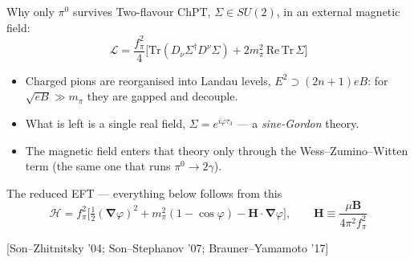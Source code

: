 \documentclass[aspectratio=169,10pt]{beamer}
\newcommand{\B}{\bm{B}}
\newcommand{\Hb}{\bm{H}}
\newcommand{\gr}{\bm{\nabla}}
\newcommand{\fpi}{f_\pi}
\newcommand{\mpi}{m_\pi}
\newcommand{\cit}[1]{{\scriptsize\color{gray}[#1]}}
\begin{document}
\begin{frame}{Why only $\pi^0$ survives}
Two-flavour ChPT, $\Sigma\in SU(2)$, in an external magnetic field:
\[
 \mathcal L=\frac{\fpi^2}{4}\Big[\mathrm{Tr}(D_\nu\Sigma^\dagger D^\nu\Sigma)
 +2\mpi^2\,\mathrm{Re}\,\mathrm{Tr}\,\Sigma\Big]
\]
\begin{itemize}
  \item Charged pions are reorganised into Landau levels,
        $E^2 \supset (2n+1)eB$: for $\sqrt{eB}\gg\mpi$ they are \alert{gapped and
        decouple}.
  \item What is left is a single real field, $\Sigma=e^{i\varphi\tau_3}$ ---
        a \emph{sine-Gordon} theory.
  \item The magnetic field enters that theory only through the
        \alert{Wess--Zumino--Witten} term (the same one that runs
        $\pi^0\to2\gamma$).
\end{itemize}
\vspace{2mm}
\begin{block}{The reduced EFT --- everything below follows from this}
\[
 \mathcal H=\fpi^2\Big[\tfrac12(\gr\varphi)^2+\mpi^2(1-\cos\varphi)
 -\Hb\cdot\gr\varphi\Big],
 \qquad \Hb\equiv\frac{\mu\B}{4\pi^2\fpi^2}
\]
\end{block}
\cit{Son--Zhitnitsky '04; Son--Stephanov '07; Brauner--Yamamoto '17}
\end{frame}
\end{document}
